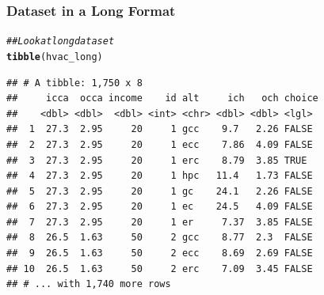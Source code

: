 \documentclass{beamer}\usepackage[]{graphicx}\usepackage[]{xcolor}
\makeatletter
\newcommand{\hlnum}[1]{\textcolor[rgb]{0.686,0.059,0.569}{#1}}%
\newcommand{\hlcom}[1]{\textcolor[rgb]{0.678,0.584,0.686}{\textit{#1}}}%
\newcommand{\hlopt}[1]{\textcolor[rgb]{0,0,0}{#1}}%
\newcommand{\hlstd}[1]{\textcolor[rgb]{0.345,0.345,0.345}{#1}}%
\newcommand{\hlkwb}[1]{\textcolor[rgb]{0.69,0.353,0.396}{#1}}%
\newcommand{\hlkwc}[1]{\textcolor[rgb]{0.333,0.667,0.333}{#1}}%
\newcommand{\hlkwd}[1]{\textcolor[rgb]{0.737,0.353,0.396}{\textbf{#1}}}%
\newenvironment{kframe}{%
 \def\at@end@of@kframe{}%
 \ifinner\ifhmode%
  \def\at@end@of@kframe{\end{minipage}}%
  \begin{minipage}{\columnwidth}%
 \fi\fi%
 \def\FrameCommand##1{\hskip\@totalleftmargin \hskip-\fboxsep
 \colorbox{shadecolor}{##1}\hskip-\fboxsep
     \hskip-\linewidth \hskip-\@totalleftmargin \hskip\columnwidth}%
 \MakeFramed {\advance\hsize-\width
   \@totalleftmargin\z@ \linewidth\hsize
   \@setminipage}}%
 {\par\unskip\endMakeFramed%
 \at@end@of@kframe}
\newenvironment{knitrout}{}{} %
\makeatother
\begin{document}
\begin{frame}[fragile]\frametitle{Dataset in a Long Format}
\begin{knitrout}\footnotesize
{}\color{fgcolor}\begin{kframe}
\begin{alltt}
\hlcom{## Look at long dataset}
\hlkwd{tibble}\hlstd{(hvac_long)}
\end{alltt}
\begin{verbatim}
## # A tibble: 1,750 x 8
##     icca  occa income    id alt     ich   och choice
##    <dbl> <dbl>  <dbl> <int> <chr> <dbl> <dbl> <lgl> 
##  1  27.3  2.95     20     1 gcc    9.7   2.26 FALSE 
##  2  27.3  2.95     20     1 ecc    7.86  4.09 FALSE 
##  3  27.3  2.95     20     1 erc    8.79  3.85 TRUE  
##  4  27.3  2.95     20     1 hpc   11.4   1.73 FALSE 
##  5  27.3  2.95     20     1 gc    24.1   2.26 FALSE 
##  6  27.3  2.95     20     1 ec    24.5   4.09 FALSE 
##  7  27.3  2.95     20     1 er     7.37  3.85 FALSE 
##  8  26.5  1.63     50     2 gcc    8.77  2.3  FALSE 
##  9  26.5  1.63     50     2 ecc    8.69  2.69 FALSE 
## 10  26.5  1.63     50     2 erc    7.09  3.45 FALSE 
## # ... with 1,740 more rows
\end{verbatim}
\end{kframe}
\end{knitrout}
\end{frame}

\end{document}
